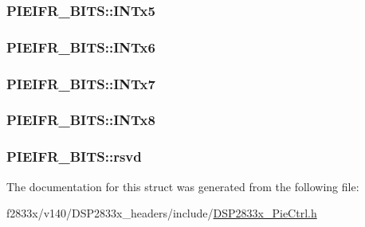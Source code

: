 \subsubsection[{I\+N\+Tx5}]{ P\+I\+E\+I\+F\+R\+\_\+\+B\+I\+T\+S\+::\+I\+N\+Tx5}\label{struct_p_i_e_i_f_r___b_i_t_s_a96f8377418eba46dfd0dfdd96c6b3bfc}
\hypertarget{struct_p_i_e_i_f_r___b_i_t_s_a3f4032509ff63b4a2c9901d059e1987e}{}
\subsubsection[{I\+N\+Tx6}]{ P\+I\+E\+I\+F\+R\+\_\+\+B\+I\+T\+S\+::\+I\+N\+Tx6}\label{struct_p_i_e_i_f_r___b_i_t_s_a3f4032509ff63b4a2c9901d059e1987e}
\hypertarget{struct_p_i_e_i_f_r___b_i_t_s_a58d5d27b316a21f33dd92973c3ea1bb8}{}
\subsubsection[{I\+N\+Tx7}]{ P\+I\+E\+I\+F\+R\+\_\+\+B\+I\+T\+S\+::\+I\+N\+Tx7}\label{struct_p_i_e_i_f_r___b_i_t_s_a58d5d27b316a21f33dd92973c3ea1bb8}
\hypertarget{struct_p_i_e_i_f_r___b_i_t_s_ab8339a5276d9f4f5507607809e36ac73}{}
\subsubsection[{I\+N\+Tx8}]{ P\+I\+E\+I\+F\+R\+\_\+\+B\+I\+T\+S\+::\+I\+N\+Tx8}\label{struct_p_i_e_i_f_r___b_i_t_s_ab8339a5276d9f4f5507607809e36ac73}
\hypertarget{struct_p_i_e_i_f_r___b_i_t_s_a320475e23a9bbe2fe16e56d2a080d39e}{}
\subsubsection[{rsvd}]{ P\+I\+E\+I\+F\+R\+\_\+\+B\+I\+T\+S\+::rsvd}\label{struct_p_i_e_i_f_r___b_i_t_s_a320475e23a9bbe2fe16e56d2a080d39e}


The documentation for this struct was generated from the following file\+:\begin{DoxyCompactItemize}
\item 
f2833x/v140/\+D\+S\+P2833x\+\_\+headers/include/\hyperlink{_d_s_p2833x___pie_ctrl_8h}{D\+S\+P2833x\+\_\+\+Pie\+Ctrl.\+h}\end{DoxyCompactItemize}
